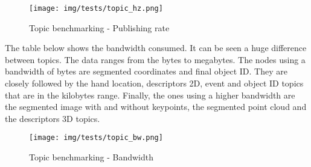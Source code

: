 \begin{itemize}
			\begin{figure}[h]
				\begin{center}
			    \texttt{[image: img/tests/topic\_hz.png]}
				\caption[Topic benchmarking - Publishing rate]{Topic benchmarking - Publishing rate}
				\label{hz}
				\end{center}
			\end{figure}

			The table below shows the bandwidth consumed. 
			It can be seen a huge difference between topics. 
			The data ranges from the bytes to megabytes. 
			The nodes using a bandwidth of bytes are segmented coordinates and final object ID. 
			They are closely followed by the hand location, descriptors 2D, event and object ID topics that are in the kilobytes range. 
			Finally, the ones using a higher bandwidth are the segmented image with and without keypoints, the segmented point cloud and the descriptors 3D topics. 
			\begin{figure}[h]
				\begin{center}
			    \texttt{[image: img/tests/topic\_bw.png]}
				\caption[Topic benchmarking - Bandwidth]{Topic benchmarking - Bandwidth}
				\label{bw}
				\end{center}
			\end{figure}

	\end{itemize}